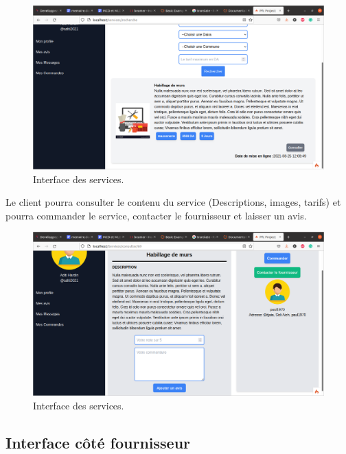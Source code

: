 \documentclass[french]{report}
\begin{document}
            \begin{figure}[H]
                \centering
                \includegraphics[width=1\textwidth]{images/services.png} 
                \caption{Interface des services.}
            \end{figure}
            
            Le client pourra consulter le contenu du service (Descriptions, images, tarifs)
	    et pourra commander le service, contacter le fournisseur et laisser un avis.
            
             \begin{figure}[H]
                \centering
                \includegraphics[width=1\textwidth]{images/service consult.png} 
                \caption{Interface des services.}
            \end{figure}
            
            \subsection{Interface côté fournisseur}
            
\end{document}
